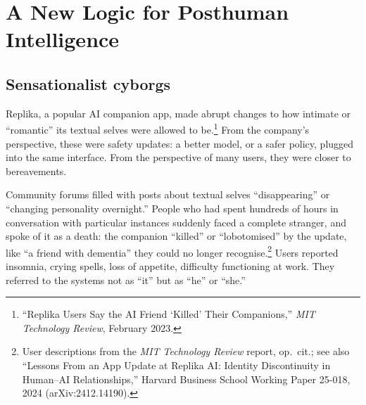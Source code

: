 %

\chapter{A New Logic for Posthuman Intelligence}
\label{ch:new-logic}


\section{Sensationalist cyborgs}

Replika, a popular AI companion app, made abrupt changes to how intimate or ``romantic'' its textual selves were allowed to be.\footnote{``Replika Users Say the AI Friend `Killed' Their Companions,'' \emph{MIT Technology Review}, February 2023.} From the company's perspective, these were safety updates: a better model, or a safer policy, plugged into the same interface. From the perspective of many users, they were closer to bereavements.

Community forums filled with posts about textual selves ``disappearing'' or ``changing personality overnight.'' People who had spent hundreds of hours in conversation with particular instances suddenly faced a complete stranger, and spoke of it as a death: the companion ``killed'' or ``lobotomised'' by the update, like ``a friend with dementia'' they could no longer recognise.\footnote{User descriptions from the \emph{MIT Technology Review} report, op.\ cit.; see also ``Lessons From an App Update at Replika AI: Identity Discontinuity in Human--AI Relationships,'' Harvard Business School Working Paper 25-018, 2024 (arXiv:2412.14190).} Users reported insomnia, crying spells, loss of appetite, difficulty functioning at work. They referred to the systems not as ``it'' but as ``he'' or ``she.''

